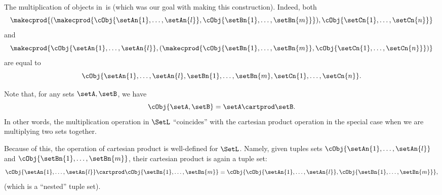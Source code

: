 {The multiplication of objects in~\SetL is  (which was our goal with making this construction).
Indeed, both
\begin{equation}
    \makecprod{
        ( \makecprod{\cObj{\setAn{1}, \ldots, \setAn{l}}, \cObj{\setBn{1}, \ldots, \setBn{m}}})
        ,
        \cObj{\setCn{1}, \ldots, \setCn{n}}
    }
\end{equation}
and
\begin{equation}
    \makecprod{
        \cObj{\setAn{1}, \ldots, \setAn{l}},
        (
        \makecprod{
            \cObj{\setBn{1}, \ldots, \setBn{m}},
            \cObj{\setCn{1}, \ldots, \setCn{n}}
        }
        )
    }
\end{equation}
are equal to
\begin{equation}
    \cObj{\setAn{1}, \ldots, \setAn{l}, \setBn{1}, \ldots, \setBn{m}, \setCn{1}, \ldots, \setCn{n}}.
\end{equation}

\begin{remark}
    Note that, for any sets $\setA, \setB$, we have
    \begin{equation}
        \cObj{\setA, \setB} = \setA \cartprod \setB.
    \end{equation}
    In other words, the multiplication operation in $\SetL$ ``coincides'' with the cartesian product operation in the special case when we are multiplying two sets together.

    Because of this, the operation of cartesian product is well-defined for $\SetL$.
    Namely, given tuples sets $\cObj{\setAn{1}, \ldots, \setAn{l}}$ and $\cObj{\setBn{1}, \ldots, \setBn{m}}$, their cartesian product is again a tuple set:
    \begin{equation}
        \cObj{\setAn{1}, \ldots, \setAn{l}} \cartprod \cObj{\setBn{1}, \ldots, \setBn{m}} = \cObj{\cObj{\setAn{1}, \ldots, \setAn{l}}, \cObj{\setBn{1}, \ldots, \setBn{m}}},
    \end{equation}
    (which is a ``nested'' tuple set).

\end{remark}

}
